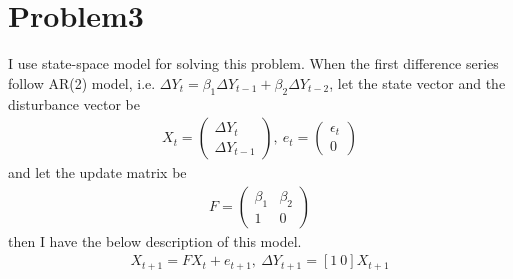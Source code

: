 \documentclass{article}
\begin{document}
\section{Problem3}
 I use state-space model for solving this problem. When the first difference series follow AR(2) model, i.e. $\Delta Y_t = \beta_1 \Delta Y_{t-1}+ \beta_2 \Delta Y_{t-2}$, let the state vector and the disturbance vector be
 \begin{align*}
 	X_t = \begin{pmatrix}
	\Delta Y_t \\
	\Delta Y_{t-1}
	\end{pmatrix},\ 
	e_{t} = \begin{pmatrix}
	\epsilon_{t}\\
	0
	\end{pmatrix}
 \end{align*}
 and let the update matrix be
 \begin{align*}
 	F = \begin{pmatrix}
	\beta_1 & \beta_2\\
	1 & 0
	\end{pmatrix}
 \end{align*}
then I have the below description of this model.
\begin{align*}
	X_{t+1} = F X_t + e_{t+1},\ \Delta Y_{t+1} = [1\ 0] X_{t+1}
\end{align*}
\end{document}
